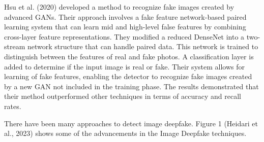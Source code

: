 Hsu et al. (2020) \cite{hung2021multi} developed a method to recognize fake images created by advanced GANs. Their approach involves a fake feature network-based paired learning system that can learn mid and high-level false features by combining cross-layer feature representations. They modified a reduced DenseNet into a two-stream network structure that can handle paired data. This network is trained to distinguish between the features of real and fake photos. A classification layer is added to determine if the input image is real or fake. Their system allows for learning of fake features, enabling the detector to recognize fake images created by a new GAN not included in the training phase. The results demonstrated that their method outperformed other techniques in terms of accuracy and recall rates.

 
There have been many approaches to detect image deepfake. Figure 1 (Heidari et al., 2023) \cite{heidari2023deepfake}  shows some of the advancements in the Image Deepfake techniques.

